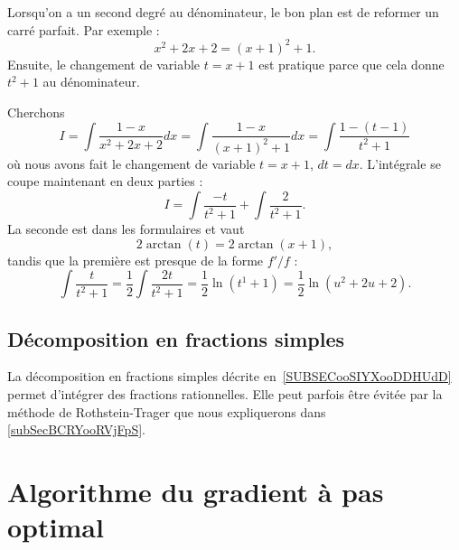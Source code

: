 Lorsqu'on a un second degré au dénominateur, le bon plan est de reformer un carré parfait. Par exemple :
\begin{equation}
	x^2+2x+2=(x+1)^2+1.
\end{equation}
Ensuite, le changement de variable $t=x+1$ est pratique parce que cela donne $t^2+1$ au dénominateur.

Cherchons
\begin{equation}
	I=\int \frac{ 1-x }{ x^2+2x+2 }dx=\int\frac{ 1-x }{ (x+1)^2+1 }dx=\int\frac{ 1-(t-1) }{ t^2+1 }
\end{equation}
où nous avons fait le changement de variable $t=x+1$, $dt=dx$. L'intégrale se coupe maintenant en deux parties :
\begin{equation}
	I=\int\frac{ -t }{ t^2+1 }+\int \frac{ 2 }{ t^2+1 }.
\end{equation}
La seconde est dans les formulaires et vaut
\begin{equation}
	2\arctan(t)=2\arctan(x+1),
\end{equation}
tandis que la première est presque de la forme $f'/f$ :
\begin{equation}
	\int\frac{ t }{ t^2+1 }=\frac{ 1 }{2}\int \frac{ 2t }{ t^2+1 }=\frac{ 1 }{2}\ln(t^1+1)=\frac{ 1 }{2}\ln(u^2+2u+2).
\end{equation}

\subsection{Décomposition en fractions simples}

La décomposition en fractions simples décrite en~\ref{SUBSECooSIYXooDDHUdD} permet d'intégrer des fractions rationnelles. Elle peut parfois être évitée par la méthode de Rothstein-Trager que nous expliquerons dans \ref{subSecBCRYooRVjFpS}.

\section{Algorithme du gradient à pas optimal}

